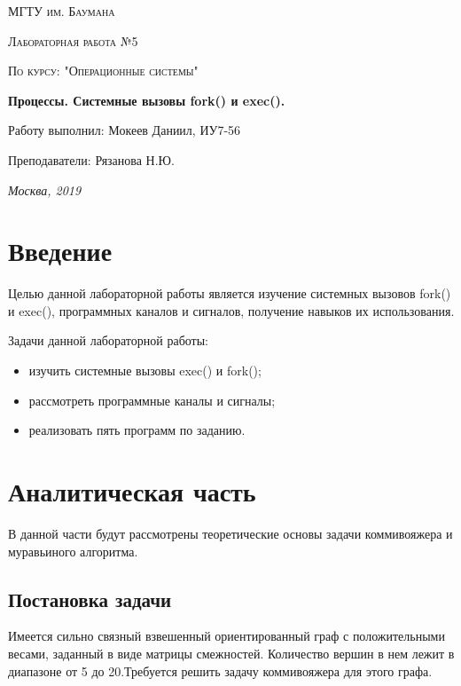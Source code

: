 \documentclass[12pt]{report}
\begin{document}
\begin{titlepage}
	\centering
	{\scshape\LARGE МГТУ им. Баумана \par}
	\vspace{3cm}
	{\scshape\Large Лабораторная работа №5\par}
	\vspace{0.5cm}	
	{\scshape\Large По курсу: "Операционные системы"\par}
	\vspace{1.5cm}
	{\huge\bfseries Процессы. Системные вызовы fork() и exec().\par}
	\vspace{2cm}
	\Large Работу выполнил: Мокеев Даниил, ИУ7-56\par
	\vspace{0.5cm}
	\Large Преподаватели:  Рязанова Н.Ю.\par

	\vfill
	\large \textit {Москва, 2019} \par
\end{titlepage}

\tableofcontents

\newpage
\chapter*{Введение}
Целью данной лабораторной работы является изучение системных вызовов fork() и exec(), программных каналов и сигналов, получение навыков их использования.

Задачи данной лабораторной работы:
\begin{itemize}
	\item изучить системные вызовы exec() и fork();
	\item рассмотреть программные каналы и сигналы;
	\item реализовать пять программ по заданию.
\end{itemize}

\chapter{Аналитическая часть}
В данной части будут рассмотрены теоретические основы задачи коммивояжера и муравьиного алгоритма. 

\section{Постановка задачи} 
Имеется сильно связный взвешенный ориентированный граф \cite{diskr} с положительными весами, заданный в виде матрицы смежностей. Количество вершин в нем лежит в диапазоне от 5 до 20.Требуется решить задачу коммивояжера для этого графа. 
\end{document}
